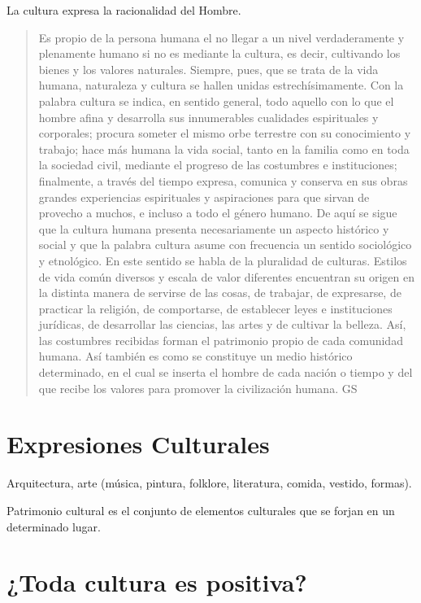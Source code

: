 \documentclass[a4paper,12pt,oneside]{article}
\begin{document}
La cultura expresa la racionalidad del Hombre.

\begin{quote}
Es propio de la persona humana el no llegar a un nivel verdaderamente y plenamente humano si no es mediante la cultura, es decir, cultivando los bienes y los valores naturales. Siempre, pues, que se trata de la vida humana, naturaleza y cultura se hallen unidas estrechísimamente. Con la palabra cultura se indica, en sentido general, todo aquello con lo que el hombre afina y desarrolla sus innumerables cualidades espirituales y corporales; procura someter el mismo orbe terrestre con su conocimiento y trabajo; hace más humana la vida social, tanto en la familia como en toda la sociedad civil, mediante el progreso de las costumbres e instituciones; finalmente, a través del tiempo expresa, comunica y conserva en sus obras grandes experiencias espirituales y aspiraciones para que sirvan de provecho a muchos, e incluso a todo el género humano. De aquí se sigue que la cultura humana presenta necesariamente un aspecto histórico y social y que la palabra cultura asume con frecuencia un sentido sociológico y etnológico. En este sentido se habla de la pluralidad de culturas. Estilos de vida común diversos y escala de valor diferentes encuentran su origen en la distinta manera de servirse de las cosas, de trabajar, de expresarse, de practicar la religión, de comportarse, de establecer leyes e instituciones jurídicas, de desarrollar las ciencias, las artes y de cultivar la belleza. Así, las costumbres recibidas forman el patrimonio propio de cada comunidad humana. Así también es como se constituye un medio histórico determinado, en el cual se inserta el hombre de cada nación o tiempo y del que recibe los valores para promover la civilización humana. GS
\end{quote}

\section*{Expresiones Culturales}

Arquitectura, arte (música, pintura, folklore, literatura, comida, vestido, formas).

Patrimonio cultural es el conjunto de elementos culturales que se forjan en un determinado lugar.

\section*{¿Toda cultura es positiva?}
\end{document}

